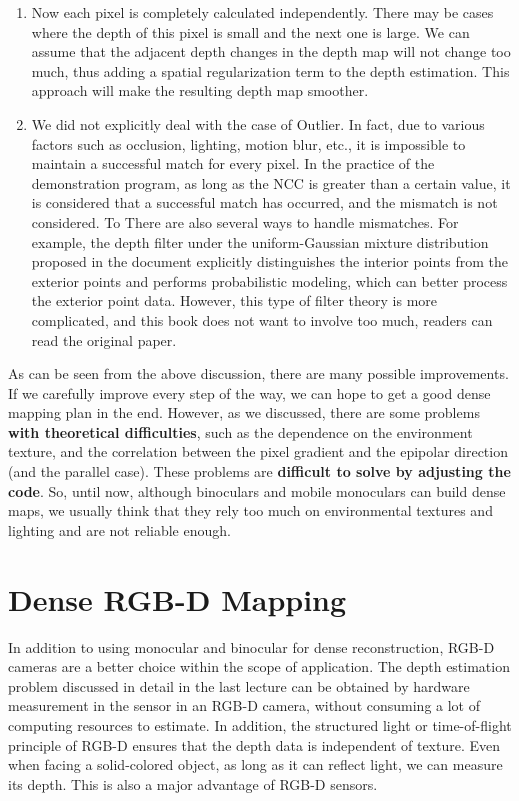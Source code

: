 \begin{enumerate}
	\item Now each pixel is completely calculated independently. There may be cases where the depth of this pixel is small and the next one is large. We can assume that the adjacent depth changes in the depth map will not change too much, thus adding a spatial regularization term to the depth estimation. This approach will make the resulting depth map smoother.
	\item We did not explicitly deal with the case of Outlier. In fact, due to various factors such as occlusion, lighting, motion blur, etc., it is impossible to maintain a successful match for every pixel. In the practice of the demonstration program, as long as the NCC is greater than a certain value, it is considered that a successful match has occurred, and the mismatch is not considered.
	To
	There are also several ways to handle mismatches. For example, the depth filter under the uniform-Gaussian mixture distribution proposed in the document \cite{Vogiatzis2011} explicitly distinguishes the interior points from the exterior points and performs probabilistic modeling, which can better process the exterior point data. However, this type of filter theory is more complicated, and this book does not want to involve too much, readers can read the original paper.
\end{enumerate}

As can be seen from the above discussion, there are many possible improvements. If we carefully improve every step of the way, we can hope to get a good dense mapping plan in the end. However, as we discussed, there are some problems \textbf{with theoretical difficulties}, such as the dependence on the environment texture, and the correlation between the pixel gradient and the epipolar direction (and the parallel case). These problems are \textbf{difficult to solve by adjusting the code}. So, until now, although binoculars and mobile monoculars can build dense maps, we usually think that they rely too much on environmental textures and lighting and are not reliable enough.

\section{Dense RGB-D Mapping}
In addition to using monocular and binocular for dense reconstruction, RGB-D cameras are a better choice within the scope of application. The depth estimation problem discussed in detail in the last lecture can be obtained by hardware measurement in the sensor in an RGB-D camera, without consuming a lot of computing resources to estimate. In addition, the structured light or time-of-flight principle of RGB-D ensures that the depth data is independent of texture. Even when facing a solid-colored object, as long as it can reflect light, we can measure its depth. This is also a major advantage of RGB-D sensors.

